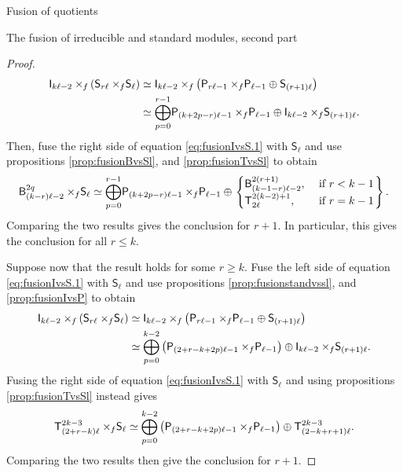 \documentclass[reqno]{amsart}
\newcommand{\ds}[1]{\mathsf S_{#1}}
\newcommand{\dl}[1]{\mathsf I_{#1}}
\newcommand{\dP}[1]{\mathsf P_{#1}}
\newcommand{\xf}{\times\hspace{-0.27em}_f}
\newcommand{\T}[2]{\mathsf{T}^{#1}_{#2}}
\newcommand{\B}[2]{\mathsf{B}^{#1}_{#2}}
\newcommand{\lc}{\ell}
\begin{document}
\begin{section}{Fusion of quotients}
\begin{subsection}{The fusion of irreducible and standard modules, second part}
\begin{proof}
\begin{align}
	\dl{k \lc -2} \xf \left(\ds{r \lc} \xf \ds{ \lc}\right) &\simeq \dl{k \lc -2} \xf \left(\dP{r\lc-1} \xf \dP{\lc-1} \oplus \ds{(r+1)\lc} \right)\notag\\
	& \simeq \overset{r-1}{\underset{p = 0}{\bigoplus}}\dP{(k+2p-r)\lc-1} \xf \dP{\lc -1} \oplus  \dl{k \lc -2} \xf \ds{(r+1)\lc}.
\end{align}
Then, fuse the right side of equation \eqref{eq:fusionIvsS.1} with $\ds{\lc}$ and use propositions \ref{prop:fusionBvsSl}, and \ref{prop:fusionTvsSl} to obtain
\begin{equation}
\B{2q}{(k-r)\lc -2} \xf \ds{\lc} \simeq \overset{r-1}{\underset{p = 0}{\bigoplus}}\dP{(k+2p-r)\lc-1} \xf \dP{\lc -1} \oplus \left. \begin{cases}
\B{2(r+1)}{(k-1-r)\lc-2}, & \text{ if }  r< k-1\\
\T{2(k-2)+1}{2\lc}, & \text{ if } r=k-1
\end{cases}\right\rbrace .
\end{equation}
Comparing the two results gives the conclusion for $r+1$. In particular, this gives the conclusion for all $r \leq k$. 

 Suppose now that the result holds for some $r\geq k$. Fuse the left side of equation \eqref{eq:fusionIvsS.1} with $\ds{\lc}$ and use propositions \ref{prop:fusionstandvssl}, and \ref{prop:fusionIvsP} to obtain
 \begin{align}
 	\dl{k \lc -2} \xf \left( \ds{r \lc} \xf \ds{ \lc} \right)& \simeq \dl{k \lc -2} \xf \left(\dP{r\lc-1} \xf \dP{\lc-1} \oplus \ds{(r+1)\lc} \right) \notag \\
 	& \simeq  \overset{k-2}{\underset{p=0}{\bigoplus}}\left( \dP{(2+r-k+2p)\lc-1} \xf \dP{\lc-1}\right) \oplus  \dl{k \lc -2} \xf \ds{(r+1)\lc}.
 \end{align}
Fusing the right side of equation \eqref{eq:fusionIvsS.1} with $\ds{\lc}$ and using propositions \ref{prop:fusionTvsSl} instead gives
\begin{equation}
\T{2k-3}{(2+r-k)\lc} \xf \ds{\lc} \simeq \overset{k-2}{\underset{p=0}{\bigoplus}}\left( \dP{(2+r-k+2p)\lc-1} \xf \dP{\lc-1}\right) \oplus \T{2k-3}{(2-k+r+1)\lc}.
\end{equation}
Comparing the two results then give the conclusion for $r+1$.


\end{proof}
\end{subsection}
\end{section}
\end{document}
